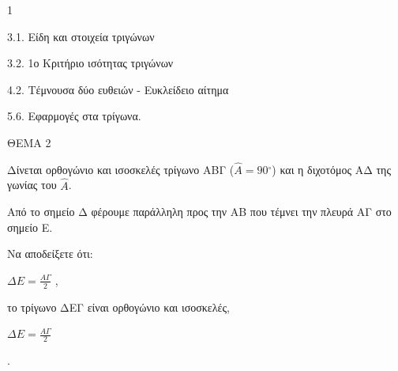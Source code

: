 \begin{ylh}{1}
    \item 3.1. Είδη και στοιχεία τριγώνων
    \item 3.2. 1ο Κριτήριο ισότητας τριγώνων
    \item 4.2. Τέμνουσα δύο ευθειών - Ευκλείδειο αίτημα
    \item 5.6. Εφαρμογές στα τρίγωνα.
\end{ylh}

ΘΕΜΑ 2

Δίνεται ορθογώνιο και ισοσκελές τρίγωνο ΑΒΓ ($\widehat{A} = 90{^\circ}$) και η διχοτόμος ΑΔ της γωνίας του $\widehat{A}$.

Από το σημείο Δ φέρουμε παράλληλη προς την ΑΒ που τέμνει την πλευρά ΑΓ στο σημείο Ε.

Να αποδείξετε ότι:

\begin{alist}
\item $\Delta E = \frac{A\Gamma}{2}$
, 

\item το τρίγωνο ΔΕΓ είναι ορθογώνιο και ισοσκελές, 

\item $\Delta E = \frac{A\Gamma}{2}$

\begin{center}
\end{center}
. 
\end{alist}

